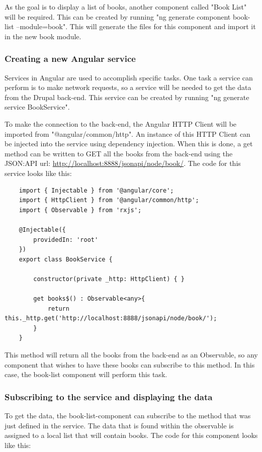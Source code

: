 As the goal is to display a list of books, another component called "Book List" will be required. This can be created by running "ng generate component book-list --module=book". This will generate the files for this component and import it in the new book module. 

\subsubsection{Creating a new Angular service}

Services in Angular are used to accomplish specific tasks. One task a service can perform is to make network requests, so a service will be needed to get the data from the Drupal back-end. This service can be created by running "ng generate service BookService".

To make the connection to the back-end, the Angular HTTP Client will be imported from "@angular/common/http". An instance of this HTTP Client can be injected into the service using dependency injection. When this is done, a get method can be written to GET all the books from the back-end using the JSON:API url: \url{http://localhost:8888/jsonapi/node/book/}. The code for this service looks like this: 

\begin{lstlisting}
	import { Injectable } from '@angular/core';
	import { HttpClient } from '@angular/common/http';
	import { Observable } from 'rxjs';
	
	@Injectable({
		providedIn: 'root'
	})
	export class BookService {
		
		constructor(private _http: HttpClient) { }
		
		get books$() : Observable<any>{
			return this._http.get('http://localhost:8888/jsonapi/node/book/');
		}
	}
\end{lstlisting}

This method will return all the books from the back-end as an Observable, so any component that wishes to have these books can subscribe to this method. In this case, the book-list component will perform this task.

\subsubsection{Subscribing to the service and displaying the data}

To get the data, the book-list-component can subscribe to the method that was just defined in the service. The data that is found within the observable is assigned to a local list that will contain books. The code for this component looks like this:

